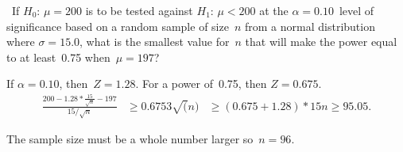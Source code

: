 \begin{problem}
  ~If $H_0$: ${\mu = 200}$ is to be tested against $H_1$: ${\mu < 200}$ at the ${\alpha = 0.10}$~level of significance based on a random sample of size~$n$ from a normal distribution where ${\sigma = 15.0}$, what is the smallest value for~$n$ that will make the power equal to at least~0.75 when~${\mu = 197}$?
\end{problem}

If ${\alpha = 0.10}$, then~${Z = 1.28}$.  For a power of~0.75, then ${Z=0.675}$.
\begin{align*}
  \frac{200 - 1.28 *\frac{15}{\sqrt{n}} - 197}{15 / \sqrt{n}} &\geq 0.675
  3 \sqrt(n) &\geq ( 0.675 + 1.28) * 15
  n \geq 95.05 \text{.}
\end{align*}

The sample size must be a whole number larger so~$\boxed{n = 96}$.
